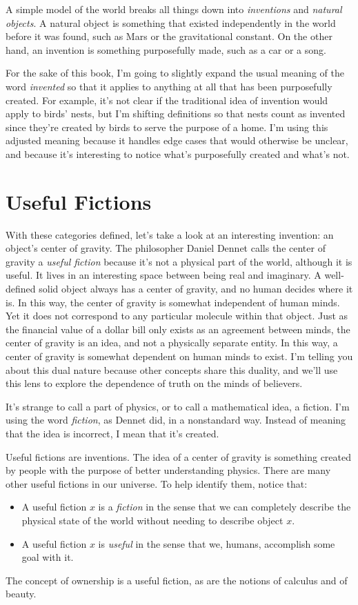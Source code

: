 \documentclass[9pt, twoside]{book}
\theoremstyle{argtstyle}
\begin{document}
A simple model of the world breaks all things down into {\em inventions} and
{\em natural objects}.
A natural object is something that existed independently in the
world before it was found, such as Mars or the gravitational constant.
On the other hand, an
invention is something purposefully made, such as
a car or a song.

For the sake of this book, I'm going to slightly expand
the usual meaning of the word {\em invented} so that it applies
to anything at all that has been purposefully created.
For example,
it's not clear if the traditional idea of invention would apply to birds' nests,
but I'm shifting definitions so that nests count as invented since
they're
created by birds to serve the purpose of a
home.
I'm using this adjusted meaning because it handles edge cases that would
otherwise be unclear, and because it's interesting to notice
what's purposefully created and what's not.

\section{Useful Fictions}

With these categories defined,
let's take a look at an interesting invention: an object's
center of gravity.
The philosopher Daniel Dennet calls the center of gravity
a {\em useful fiction}
because it's not a physical part of the world, although it is useful.
It lives in an interesting space between being real and imaginary.
A well-defined solid object always has a center of gravity,
and no human decides where it is.
In this way, the center of gravity
is somewhat independent of human minds.
Yet it does not correspond to any particular molecule within that object.
Just as the financial value of a dollar bill only exists as an agreement between
minds, the center of gravity is an idea, and not a physically separate
entity.
In this way, a center of gravity is somewhat dependent
on human minds to exist.
I'm telling you about this dual nature because
other concepts share this duality, and we'll use this lens to explore
the dependence of truth on the minds of believers.

It's strange to call a part of physics, or to call a mathematical idea, a
fiction. 
I'm using the word {\em fiction}, as Dennet did, in a
nonstandard way.
Instead of meaning that the idea is incorrect, I mean that it's created.

Useful fictions are inventions.
The idea of a center of gravity is something created by
people with the purpose of better understanding physics.
There are many other useful fictions in our universe. To help identify them,
notice that:
\begin{itemize}
    \item A useful fiction $x$ is a {\em fiction}
        in the sense that we can completely
        describe the physical state of the world without needing to describe
        object $x$.
    \item A useful fiction $x$ is {\em useful} in the sense that we, humans,
        accomplish some goal with it.
\end{itemize}
The concept of ownership is a useful fiction, as are the notions of
calculus and of beauty.
\end{document}
